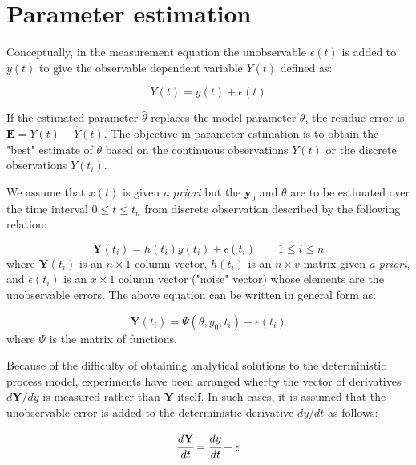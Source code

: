 \documentclass[a4paper,fleqn]{cas-dc}
\begin{document}
\newpage
\section{Parameter estimation} \label{CH: Parameter_estimation}

Conceptually, in the measurement equation the unobservable $\epsilon(t)$ is added to $y(t)$ to give the observable dependent variable $Y(t)$ defined as:

{\footnotesize
\begin{equation}
	Y(t) = y(t) + \epsilon(t)
\end{equation} }

If the estimated parameter $\hat{\theta}$ replaces the model parameter $\theta$, the residue error is $\textbf{E} = Y(t) - \hat{Y}(t)$. The objective in parameter estimation is to obtain the "best" estimate of $\theta$ based on the continuous observations $Y(t)$ or the discrete observations $Y(t_i)$. 

We assume that $x(t)$ is given \textit{a priori} but the $\textbf{y}_0$ and $\theta$ are to be estimated over the time interval $0 \leq t \leq t_n$ from discrete observation described by the following relation:

{\footnotesize
\begin{equation}
	\textbf{Y}(t_i) = h(t_i)y(t_i) + \epsilon(t_i) \qquad 1 \leq i \leq n
\end{equation} }
where $\textbf{Y}(t_i)$ is an $n \times 1$ column vector, $h(t_i)$ is an $n \times v$ matrix given \textit{a priori}, and $\epsilon (t_i)$ is an $x \times 1$ column vector ("noise" vector) whose elements are the unobservable errors. The above equation can be written in general form as:

{\footnotesize
\begin{equation} \label{EQ: Measurment_noise}
	\textbf{Y}(t_i) = \Psi(\theta, y_0, t_i) + \epsilon(t_i)
\end{equation}}
where $\Psi$ is the matrix of functions.

Because of the difficulty of obtaining analytical solutions to the deterministic process model, experiments have been arranged wherby the vector of derivatives $d\textbf{Y}/dy$ is measured rather than \textbf{Y} itself. In such cases, it is assumed that the unobservable error is added to the deterministic derivative $dy/dt$ as follows:

{\footnotesize
\begin{equation}
	\cfrac{d\textbf{Y}}{dt} = \cfrac{dy}{dt} + \epsilon
\end{equation} }
\end{document}
